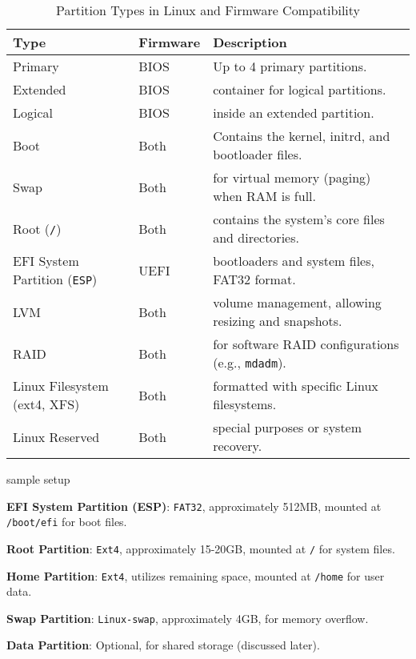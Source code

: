 \documentclass[openany, 12pt]{book}
\begin{document}
\begin{table}[ht]
	\centering
	\begin{tabular}{lll}
		\toprule
		\textbf{Type}                       & \textbf{Firmware} & \textbf{Description}                                     \\
		\midrule
		Primary                             & BIOS              & Up to 4 primary partitions.                              \\
		Extended                            & BIOS              & container for logical partitions.                        \\
		Logical                             & BIOS              & inside an extended partition.                            \\
		Boot                                & Both              & Contains the kernel, initrd, and bootloader files.       \\
		Swap                                & Both              & for virtual memory (paging) when RAM is full.            \\
		Root (\texttt{/})                   & Both              & contains the system's core files and directories.        \\
		EFI System Partition (\texttt{ESP}) & UEFI              & bootloaders and system files, FAT32 format.              \\
		LVM                                 & Both              & volume management, allowing resizing and snapshots.      \\
		RAID                                & Both              & for software RAID configurations (e.g., \texttt{mdadm}). \\
		Linux Filesystem (ext4, XFS)        & Both              & formatted with specific Linux filesystems.               \\
		Linux Reserved                      & Both              & special purposes or system recovery.                     \\
		\bottomrule
	\end{tabular}
	\caption{Partition Types in Linux and Firmware Compatibility}
\end{table}

\begin{definition}{sample setup}{}
	\begin{alist}
		\item \textbf{EFI System Partition (ESP)}: \texttt{FAT32}, approximately
		512MB, mounted at \texttt{/boot/efi} for boot files.
		\item \textbf{Root Partition}: \texttt{Ext4}, approximately 15-20GB,
		mounted at \texttt{/} for system files.
		\item \textbf{Home Partition}: \texttt{Ext4}, utilizes remaining space,
		mounted at \texttt{/home} for user data.
		\item \textbf{Swap Partition}: \texttt{Linux-swap}, approximately 4GB, for memory overflow.
		\item \textbf{Data Partition}: Optional, for shared storage (discussed
		later).
	\end{alist}
\end{definition}
\end{document}
